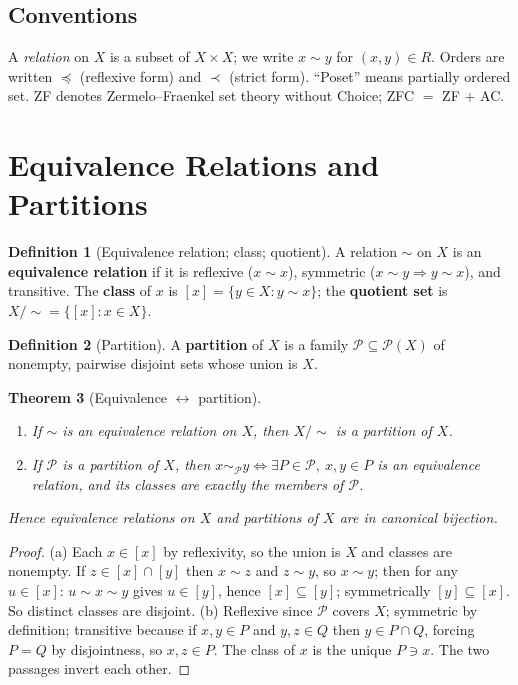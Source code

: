 \documentclass[11pt,a4paper]{article}
\newtheorem{theorem}{Theorem}[section]
\theoremstyle{definition}
\newtheorem{definition}[theorem]{Definition}
\newcommand{\Pow}{\mathcal{P}}
\begin{document}
\subsection*{Conventions}
A \emph{relation} on $X$ is a subset of $X\times X$; we write $x\sim y$ for $(x,y)\in R$.
Orders are written $\preceq$ (reflexive form) and $\prec$ (strict form). ``Poset'' means
partially ordered set. ZF denotes Zermelo--Fraenkel set theory without Choice; ZFC $=$ ZF $+$ AC.

\tableofcontents
\newpage

\section{Equivalence Relations and Partitions}

\begin{definition}[Equivalence relation; class; quotient]
A relation $\sim$ on $X$ is an \textbf{equivalence relation} if it is reflexive ($x\sim x$),
symmetric ($x\sim y\Rightarrow y\sim x$), and transitive. The \textbf{class} of $x$ is
$[x]=\{y\in X:y\sim x\}$; the \textbf{quotient set} is $X/{\sim}=\{[x]:x\in X\}$.
\end{definition}

\begin{definition}[Partition]
A \textbf{partition} of $X$ is a family $\mathcal P\subseteq\Pow(X)$ of nonempty, pairwise disjoint
sets whose union is $X$.
\end{definition}

\begin{theorem}[Equivalence $\leftrightarrow$ partition]\label{thm:equiv-partition}
\begin{enumerate}[label=(\alph*)]
  \item If $\sim$ is an equivalence relation on $X$, then $X/{\sim}$ is a partition of $X$.
  \item If $\mathcal P$ is a partition of $X$, then $x\sim_{\mathcal P} y\iff \exists P\in\mathcal P,\ x,y\in P$
    is an equivalence relation, and its classes are exactly the members of $\mathcal P$.
\end{enumerate}
Hence equivalence relations on $X$ and partitions of $X$ are in canonical bijection.
\end{theorem}
\begin{proof}
(a) Each $x\in[x]$ by reflexivity, so the union is $X$ and classes are nonempty. If
$z\in[x]\cap[y]$ then $x\sim z$ and $z\sim y$, so $x\sim y$; then for any $u\in[x]$: $u\sim x\sim y$
gives $u\in[y]$, hence $[x]\subseteq[y]$; symmetrically $[y]\subseteq[x]$. So distinct classes are
disjoint. (b) Reflexive since $\mathcal P$ covers $X$; symmetric by definition; transitive because
if $x,y\in P$ and $y,z\in Q$ then $y\in P\cap Q$, forcing $P=Q$ by disjointness, so $x,z\in P$.
The class of $x$ is the unique $P\ni x$. The two passages invert each other.
\end{proof}
\end{document}
